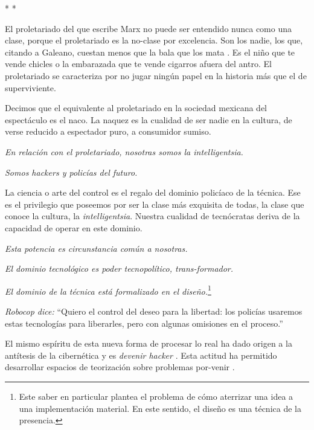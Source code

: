 \begin{center}
    * *
\end{center}

El proletariado del que escribe Marx no puede ser entendido nunca como
una clase, porque el proletariado es la no-clase por excelencia. Son los
nadie, los que, citando a Galeano, cuestan menos que la bala que los
mata \cite{Galeano2015}. Es el niño que te vende chicles
o la embarazada que te vende cigarros afuera del antro. El proletariado
se caracteriza por no jugar ningún papel en la historia más que el de
superviviente.

Decimos que el equivalente al proletariado en la sociedad mexicana del
espectáculo es el naco. La naquez es la cualidad de ser nadie en la
cultura, de verse reducido a espectador puro, a consumidor sumiso.

\emph{En relación con el proletariado, nosotras somos la
intelligentsia.}

\emph{Somos hackers y policías del futuro.}

La ciencia o arte del control es el regalo del dominio policíaco de la
técnica. Ese es el privilegio que poseemos por ser la clase más
exquisita de todas, la clase que conoce la cultura, la
\emph{intelligentsia}. Nuestra cualidad de tecnócratas deriva de la
capacidad de operar en este dominio.

\emph{Esta potencia es circunstancia común a nosotras.}

\emph{El dominio tecnológico es poder tecnopolítico, trans-formador.}

\emph{El dominio de la técnica está formalizado en el
diseño.}\footnote{Este saber en particular plantea el problema de cómo
  aterrizar una idea a una implementación material. En este sentido, el
  diseño es una técnica de la presencia.}

\emph{Robocop dice:} ``Quiero el control del deseo para la libertad: los
policías usaremos estas tecnologías para liberarles, pero con algunas
omisiones en el proceso.''

El mismo espíritu de esta nueva forma de procesar lo real ha dado origen
a la antítesis de la cibernética y es \emph{devenir
hacker} \cite{Swartz2011}. Esta actitud ha permitido
desarrollar espacios de teorización sobre problemas
por-venir \cite{Williams2017}.
